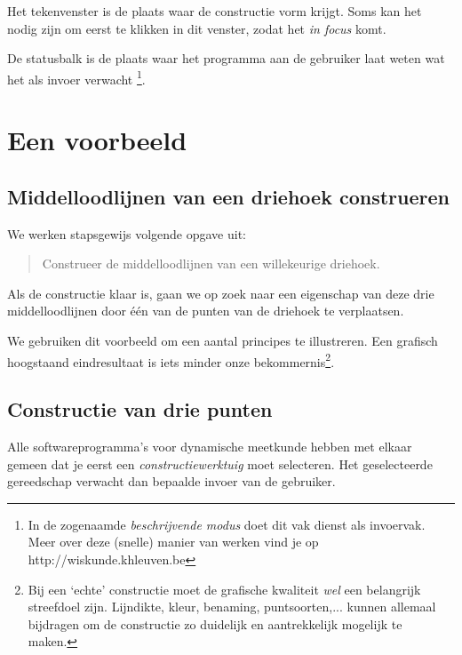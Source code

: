 Het tekenvenster is de plaats waar de constructie vorm krijgt. Soms kan het nodig zijn om eerst te klikken in dit venster, zodat het \emph{in focus} komt.

De statusbalk is de plaats waar het programma aan de gebruiker laat weten wat het als invoer verwacht \footnote{In de zogenaamde \emph{beschrijvende modus} doet dit vak dienst als invoervak. Meer over deze (snelle) manier van werken vind je op http://wiskunde.khleuven.be}. 

\section{Een voorbeeld}
\subsection{Middelloodlijnen van een driehoek construeren}
We werken stapsgewijs volgende opgave uit: 
\begin{quote}
Construeer de middelloodlijnen van een willekeurige driehoek. 
\end{quote}
Als de constructie klaar is, gaan we op zoek naar een eigenschap van deze drie middelloodlijnen door \'{e}\'{e}n van de punten van de driehoek te verplaatsen.

We gebruiken dit voorbeeld om een aantal principes te illustreren. Een grafisch hoogstaand eindresultaat is iets minder onze bekommernis\footnote{Bij een `echte' constructie moet de grafische kwaliteit \emph{wel} een belangrijk streefdoel zijn. Lijndikte, kleur, benaming, puntsoorten,... kunnen allemaal bijdragen om de constructie zo duidelijk en aantrekkelijk mogelijk te maken.}.

\subsection{Constructie van drie punten}
Alle softwareprogramma's voor dynamische meetkunde hebben met elkaar gemeen dat je eerst een \emph{constructiewerktuig} moet selecteren. Het geselecteerde gereedschap verwacht dan bepaalde invoer van de gebruiker.

